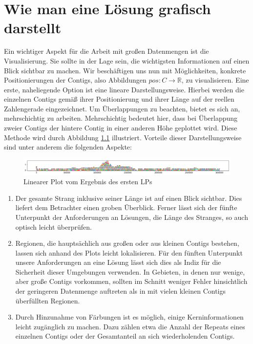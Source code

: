 \chapter{Wie man eine Lösung grafisch darstellt}\raggedbottom 
Ein wichtiger Aspekt für die Arbeit mit großen Datenmengen ist die Visualisierung.
Sie sollte in der Lage sein, die wichtigsten Informationen auf einen Blick sichtbar zu machen. Wir beschäftigen uns nun mit Möglichkeiten, konkrete Positionierungen der Contigs, also Abbildungen $pos: C \rightarrow \mathbb{R}$, zu visualisieren.
Eine erste, naheliegende Option ist eine lineare Darstellungsweise. Hierbei werden die einzelnen Contigs gemäß ihrer Positionierung und ihrer Länge auf der reellen Zahlengerade eingezeichnet. Um Überlappungen zu beachten, bietet es sich an, mehrschichtig zu arbeiten. Mehrschichtig bedeutet hier, dass bei Überlappung zweier Contigs der hintere Contig in einer anderen Höhe geplottet wird. Diese Methode wird durch Abbildung \ref{plot1} illustriert.
Vorteile dieser Darstellungsweise sind unter anderem die folgenden Aspekte:
\begin{figure}
	\begin{center}
		\includegraphics[width=17cm]{bilder/plot1}
	\end{center}
	\caption{Linearer Plot vom Ergebnis des ersten LPs}
	\label{plot1}
\end{figure}
\begin{enumerate}
	\item Der gesamte Strang inklusive seiner Länge ist auf einen Blick sichtbar. Dies liefert dem Betrachter einen groben Überblick. Ferner lässt sich der fünfte Unterpunkt der Anforderungen an Lösungen, die Länge des Stranges, so auch optisch leicht überprüfen.
	\item Regionen, die hauptsächlich aus großen oder aus kleinen Contigs bestehen, lassen sich anhand des Plots leicht lokalisieren. Für den fünften Unterpunkt unsere Anforderungen an eine Lösung lässt sich dies als Indiz für die Sicherheit dieser Umgebungen verwenden. In Gebieten, in denen nur wenige, aber große Contigs vorkommen, sollten im Schnitt weniger Fehler hinsichtlich der geringeren Datenmenge auftreten als in mit vielen kleinen Contigs überfüllten Regionen.
	\item Durch Hinzunahme von Färbungen ist es möglich, einige Kerninformationen leicht zugänglich zu machen. Dazu zählen etwa die Anzahl der Repeats eines einzelnen Contigs oder der Gesamtanteil an sich wiederholenden Contigs.
\end{enumerate}
